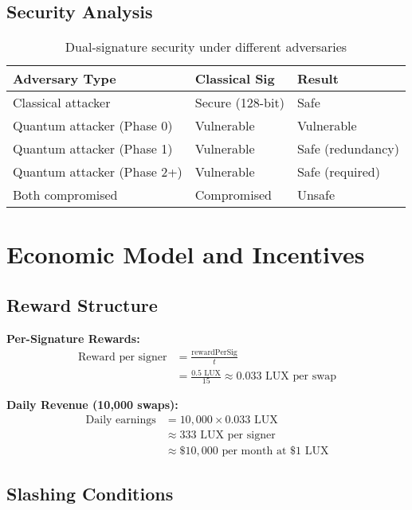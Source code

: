 \documentclass[11pt]{article}
\begin{document}
\subsection{Security Analysis}

\begin{table}[h]
\centering
\begin{tabular}{@{}lll@{}}
\toprule
\textbf{Adversary Type} & \textbf{Classical Sig} & \textbf{Result} \\
\midrule
Classical attacker & Secure (128-bit) & Safe \\
Quantum attacker (Phase 0) & Vulnerable & Vulnerable \\
Quantum attacker (Phase 1) & Vulnerable & Safe (redundancy) \\
Quantum attacker (Phase 2+) & Vulnerable & Safe (required) \\
Both compromised & Compromised & Unsafe \\
\bottomrule
\end{tabular}
\caption{Dual-signature security under different adversaries}
\label{tab:dual-sig-security}
\end{table}

\section{Economic Model and Incentives}

\subsection{Reward Structure}

\textbf{Per-Signature Rewards:}
\begin{align}
\text{Reward per signer} &= \frac{\text{rewardPerSig}}{t} \\
&= \frac{0.5 \text{ LUX}}{15} \approx 0.033 \text{ LUX per swap}
\end{align}

\textbf{Daily Revenue (10,000 swaps):}
\begin{align}
\text{Daily earnings} &= 10{,}000 \times 0.033 \text{ LUX} \\
&\approx 333 \text{ LUX per signer} \\
&\approx \$10{,}000 \text{ per month at } \$1 \text{ LUX}
\end{align}

\subsection{Slashing Conditions}
\end{document}
